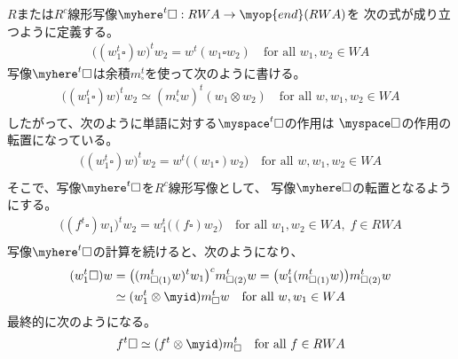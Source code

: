 	$R$または$R^c$線形写像$\myhere^t\square:RWA\to\myop{end}(RWA)$を
	次の式が成り立つように定義する。
	\begin{equation*}\begin{split} %
		\bigl((w_1^t\square)w\bigr)^tw_2 = w^t(w_1\square w_2)
		\quad\text{for all }w_1,w_2\in WA
	\end{split}\end{equation*} %
	写像$\myhere^t\square$は余積$m_\square^t$を使って次のように書ける。
	\begin{equation*}\begin{split} %
		\bigl((w_1^t\square)w\bigr)^tw_2 
		\simeq (m_\square^tw)^t(w_1\otimes w_2)
		\quad\text{for all }w,w_1,w_2\in WA \\
	\end{split}\end{equation*} %
	したがって、次のように単語に対する$\myspace^t\square$の作用は
	$\myspace\square$の作用の転置になっている。
	\begin{equation*}\begin{split} %
		\bigl((w_1^t\square)w\bigr)^tw_2 
		= w^t\bigl((w_1\square) w_2\bigr)
		\quad\text{for all }w,w_1,w_2\in WA \\
	\end{split}\end{equation*} %
	そこで、写像$\myhere^t\square$を$R^c$線形写像として、
	写像$\myhere\square$の転置となるようにする。
	\begin{equation*}\begin{split} %
		\bigl((f^t\square)w_1\bigr)^tw_2 
		= w_1^t\bigl((f\square) w_2\bigr)
		\quad\text{for all }w_1,w_2\in WA,\;f\in RWA \\
	\end{split}\end{equation*} %
	写像$\myhere^t\square$の計算を続けると、次のようになり、
	\begin{equation*}\begin{split} %
		(w_1^t\square)w
		& = \bigl((m_{\square(1)}^tw)^tw_1\bigr)^cm_{\square(2)}^tw
		= \bigl(w_1^t(m_{\square(1)}^tw)\bigr)m_{\square(2)}^tw \\
		& \simeq (w_1^t\otimes\myid)m_\square^tw
		\quad\text{for all }w,w_1\in WA \\
	\end{split}\end{equation*} %
	最終的に次のようになる。
	\begin{equation*}\begin{split} %
		f^t\square \simeq (f^t\otimes\myid)m_\square^t 
		\quad\text{for all }f\in RWA \\
	\end{split}\end{equation*} %
